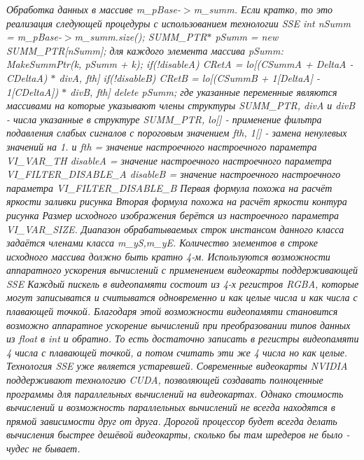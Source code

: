 \begin{DoxyCompactItemize}
\begin{DoxyCompactList}\small\item\em Обработка данных в массиве m\+\_\+p\+Base-\/$>$m\+\_\+summ. Если кратко, то это реализация следующей процедуры с использованием технологии S\+S\+E int n\+Summ = m\+\_\+p\+Base-\/$>$m\+\_\+summ.\+size(); S\+U\+M\+M\+\_\+\+P\+T\+R$\ast$ p\+Summ = new S\+U\+M\+M\+\_\+\+P\+T\+R\mbox{[}n\+Summ\mbox{]}; для каждого элемента массива p\+Summ\+: Make\+Summ\+Ptr(k, p\+Summ + k); if(!disable\+A) C\+Ret\+A = lo\mbox{[}(C\+Summ\+A + Delta\+A -\/ C\+Delta\+A) $\ast$ div\+A, fth\mbox{]} if(!disable\+B) C\+Ret\+B = lo\mbox{[}(C\+Summ\+B + 1\mbox{[}Delta\+A\mbox{]} -\/ 1\mbox{[}C\+Delta\+A\mbox{]}) $\ast$ div\+B, fth\mbox{]} delete p\+Summ; где указанные переменные являются массивами на которые указывают члены структуры S\+U\+M\+M\+\_\+\+P\+T\+R, div\+A и div\+B -\/ числа указанные в структуре S\+U\+M\+M\+\_\+\+P\+T\+R, lo\mbox{[}\mbox{]} -\/ применение фильтра подавления слабых сигналов с пороговым значением fth, 1\mbox{[}\mbox{]} -\/ замена ненулевых значений на 1. и fth = значение настроечного настроечного параметра V\+I\+\_\+\+V\+A\+R\+\_\+\+T\+H disable\+A = значение настроечного настроечного параметра V\+I\+\_\+\+F\+I\+L\+T\+E\+R\+\_\+\+D\+I\+S\+A\+B\+L\+E\+\_\+\+A disable\+B = значение настроечного настроечного параметра V\+I\+\_\+\+F\+I\+L\+T\+E\+R\+\_\+\+D\+I\+S\+A\+B\+L\+E\+\_\+\+B Первая формула похожа на расчёт яркости заливки рисунка Вторая формула похожа на расчёт яркости контура рисунка Размер исходного изображения берётся из настроечного параметра V\+I\+\_\+\+V\+A\+R\+\_\+\+S\+I\+Z\+E. Диапазон обрабатываемых строк инстансом данного класса задаётся членами класса m\+\_\+y\+S,m\+\_\+y\+E. Количество элементов в строке исходного массива должно быть кратно 4-\/м. Используются возможности аппаратного ускорения вычислений с применением видеокарты поддерживающей S\+S\+E Каждый пискель в видеопамяти состоит из 4-\/х регистров R\+G\+B\+A, которые могут записыватся и считыватся одновременно и как целые числа и как числа с плавающей точкой. Благодаря этой возможности видеопамяти становится возможно аппаратное ускорение вычислений при преобразовании типов данных из float в int и обратно. То есть достаточно записать в регистры видеопамяти 4 числа с плавающей точкой, а потом считать эти же 4 числа но как целые. Технология S\+S\+E уже является устаревшей. Современные видеокарты N\+V\+I\+D\+I\+A поддерживают технологию C\+U\+D\+A, позволяющей создавать полноценные программы для параллельных вычислений на видеокартах. Однако стоимость вычислений и возможность параллельных вычислений не всегда находятся в прямой зависимости друг от друга. Дорогой процессор будет всегда делать вычисления быстрее дешёвой видеокарты, сколько бы там шредеров не было -\/ чудес не бывает. \end{DoxyCompactList}\item 

\end{DoxyCompactItemize}

